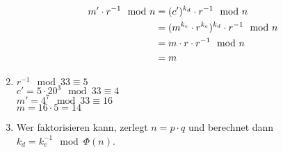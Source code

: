 \documentclass{article}
\begin{document}
\begin{enumerate}[label=(\alph*)]
		\begin{align}
			m'\cdot r^{-1}\mod n &= (c')^{k_d}\cdot r^{-1} \mod n \notag \\
			&= (m^{k_e}\cdot r^{k_e})^{k_d} \cdot r^{-1} \mod n \notag \\
			&= m\cdot r\cdot r^{-1} \mod n \notag \\
			&= m \notag
		\end{align}
		\item $r^{-1}\mod 33 \equiv 5$ \\
		$c' = 5\cdot 20^3 \mod 33 \equiv 4$ \\
		$m' = 4^7\mod 33 \equiv 16$ \\
		$m = 16\cdot 5 = 14$
		\item Wer faktorisieren kann, zerlegt $n = p\cdot q$ und berechnet dann $k_d = k_e^{-1}\mod \Phi(n)$.	
	\end{enumerate}
\end{document}
